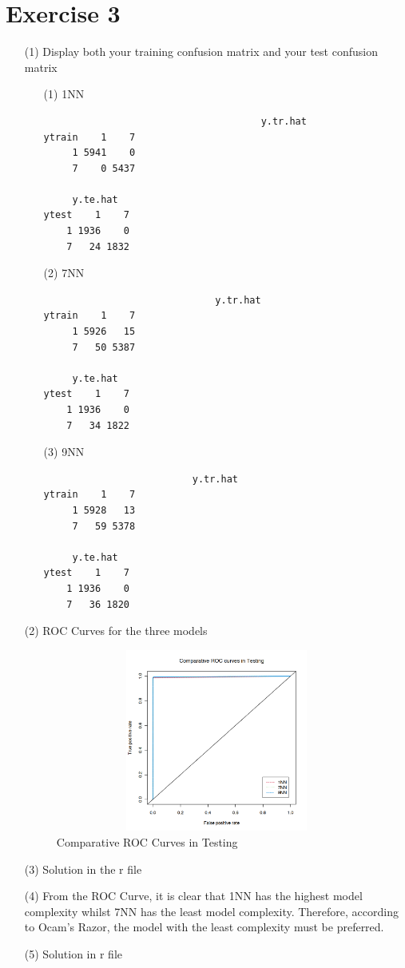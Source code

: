 \documentclass[12pt,a4paper]{article}
\begin{document}
\section *{Exercise 3}
\begin{enumerate}
	\item[(1)] Display both your training confusion matrix and your test confusion matrix
		\begin{enumerate}
				\item[(1)] 1NN
						\begin{verbatim}
								      y.tr.hat
ytrain    1    7
     1 5941    0
     7    0 5437

     y.te.hat
ytest    1    7
    1 1936    0
    7   24 1832
						\end{verbatim}
				\item[(2)] 7NN
						\begin{verbatim}
						      y.tr.hat
ytrain    1    7
     1 5926   15
     7   50 5387

     y.te.hat
ytest    1    7
    1 1936    0
    7   34 1822		
						\end{verbatim}
				
			\item[(3)] 9NN
				\begin{verbatim}
					      y.tr.hat
ytrain    1    7
     1 5928   13
     7   59 5378

     y.te.hat
ytest    1    7
    1 1936    0
    7   36 1820	
				\end{verbatim}
		\end{enumerate}
	\item[(2)] ROC Curves for the three models
		\begin{figure}[!h]
			\includegraphics[width=330pt,  height=170pt]{./graphics/q32.png}
			\caption{Comparative ROC Curves in Testing}
		\end{figure}
	\item[(3)] Solution in the r file
	\item[(4)]  From the ROC Curve, it is clear that 1NN has the highest model complexity whilst 7NN has the 
 least model complexity. Therefore, according to Ocam's Razor, the model with the least complexity 
must be preferred.
\item[(5)] Solution in r file
\end{enumerate}
\end{document}
